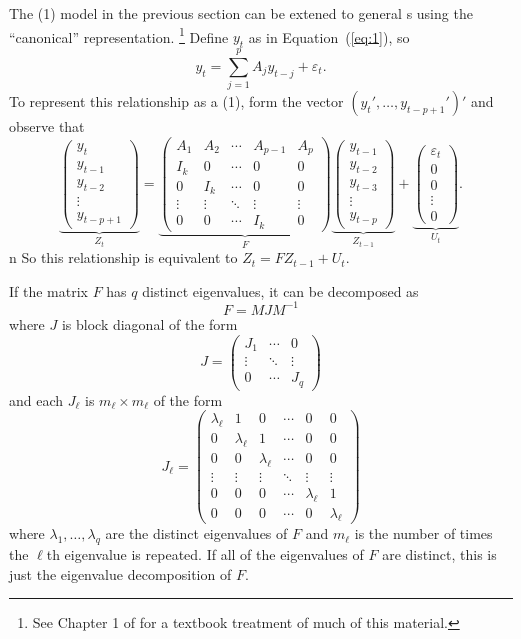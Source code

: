 \documentclass[12pt,fleqn]{article}
\newcommand{\vep}{\varepsilon}
\newcommand{\AR}{\allcaps{AR}}
\begin{document}
The \AR(1) model in the previous section can be extened to general
\VAR s using the ``canonical'' representation.%
\footnote{See Chapter 1 of \citet{Ham:94} for a textbook treatment of
  much of this material.} %
Define $y_t$ as in Equation~(\ref{eq:1}), so
\[
y_t = \sum_{j=1}^p A_j y_{t-j} + \vep_t.
\]
To represent this relationship as a \VAR(1), form the vector
$(y_t',\dots,y_{t-p+1}')'$ and observe that
\[
\underbrace{\begin{pmatrix}
  y_t \\ y_{t-1} \\ y_{t-2} \\ \vdots \\ y_{t-p+1}
\end{pmatrix}}_{Z_t}
=
\underbrace{\begin{pmatrix}
  A_1 & A_2 & \cdots & A_{p-1} & A_p \\
  I_k & 0   & \cdots & 0 & 0 \\
  0  & I_k  & \cdots & 0 & 0 \\
  \vdots & \vdots & \ddots & \vdots & \vdots \\
  0 & 0 & \cdots & I_k & 0 
\end{pmatrix}}_{F}
\underbrace{\begin{pmatrix}
  y_{t-1} \\ y_{t-2} \\ y_{t-3} \\ \vdots \\ y_{t-p}
\end{pmatrix}}_{Z_{t-1}}
+
\underbrace{\begin{pmatrix}
  \vep_{t} \\ 0 \\ 0 \\ \vdots \\ 0
\end{pmatrix}}_{U_t}.
\]n
So this relationship is equivalent to $Z_t = F Z_{t-1} + U_t$.

If the matrix $F$ has $q$ distinct
eigenvalues, it can be decomposed as
\[
F = M J M^{-1}
\]
where $J$ is block diagonal of the form
\[
J = \begin{pmatrix}
  J_1 & \cdots & 0 \\
  \vdots & \ddots & \vdots \\
  0 & \cdots & J_q
\end{pmatrix}
\]
and each $J_\ell$ is $m_\ell \times m_\ell$ of the form
\[
J_\ell =
\begin{pmatrix}
  \lambda_\ell & 1 & 0 & \cdots & 0 & 0 \\
  0 & \lambda_\ell & 1 & \cdots & 0 & 0 \\
  0 & 0 & \lambda_\ell & \cdots & 0 & 0 \\
  \vdots & \vdots & \vdots & \ddots & \vdots & \vdots \\
  0 & 0 & 0 & \cdots & \lambda_\ell & 1 \\
  0 & 0 & 0 & \cdots & 0 & \lambda_\ell
\end{pmatrix}
\]
where $\lambda_1,\dots,\lambda_q$ are the distinct eigenvalues of $F$
and $m_\ell$ is the number of times the $\ell$th eigenvalue is
repeated.  If all of the eigenvalues of $F$ are distinct, this is just
the eigenvalue decomposition of $F$.
\end{document}
